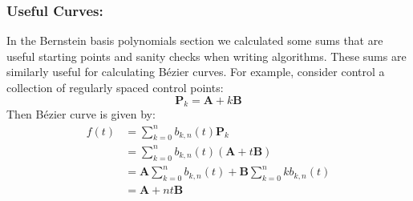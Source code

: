 \subsubsection{Useful Curves:}
In the Bernstein basis polynomials section we calculated some sums that are useful starting points and sanity checks when writing algorithms.
These sums are similarly useful for calculating Bézier curves.
For example,
consider control a collection of regularly spaced control points:
\[\mathbf{P}_k = \mathbf{A}+k\mathbf{B}\]
Then Bézier curve is given by:
\[\begin{aligned}
	f(t) &= \sum_{k=0}^nb_{k,n}(t)\mathbf{P}_k\\
	&= \sum_{k=0}^nb_{k,n}(t)(\mathbf{A}+t\mathbf{B})\\
	&= \mathbf{A}\sum_{k=0}^nb_{k,n}(t)+\mathbf{B}\sum_{k=0}^nkb_{k,n}(t)\\
	&= \mathbf{A}+nt\mathbf{B}\\
\end{aligned}\]
